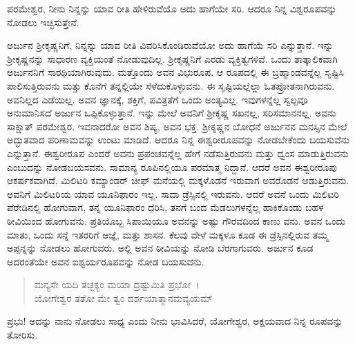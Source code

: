 {\small ಪರಮೇಶ್ವರ, ನೀನು ನಿನ್ನನ್ನು ಯಾವ ರೀತಿ ಹೇಳಿರುವೆಯೊ ಅದು ಹಾಗೆಯೇ ಸರಿ. ಆದರೂ ನಿನ್ನ ವಿಶ್ವರೂಪವನ್ನು ನೋಡಲು ಇಚ್ಛಿಸುತ್ತೇನೆ.}

ಅರ್ಜುನ ಶ‍್ರೀಕೃಷ್ಣನಿಗೆ, ನಿನ್ನನ್ನು ಯಾವ ರೀತಿ ವಿವರಿಸಿಕೊಂಡಿರುವೆಯೋ ಅದು ಹಾಗೆಯೆ ಸರಿ ಎನ್ನುತ್ತಾನೆ. ಇನ್ನು ಶ‍್ರೀಕೃಷ್ಣನನ್ನು ಸಾಧಾರಣ ವ್ಯಕ್ತಿಯಂತೆ ನೋಡುವುದಿಲ್ಲ. ಶ‍್ರೀಕೃಷ್ಣನಿಗೆ ಎರಡು ವ್ಯಕ್ತಿತ್ವಗಳಿವೆ. ಒಂದು ತಾತ್ಕಾಲಿಕವಾಗಿ ಅರ್ಜುನನಿಗೆ ಸಾರಥಿಯಾಗಿರುವುದು. ಮತ್ತೊಂದು ಅವನ ವಿಭುರೂಪ. ಆ ರೂಪದಲ್ಲಿ ಈ ಬ್ರಹ್ಮಾಂಡವನ್ನೆಲ್ಲ ಸೃಷ್ಟಿಸಿ ಪಾಲಿಸುತ್ತಿರುವನು ಮತ್ತು ಕೊನೆಗೆ ತನ್ನಲ್ಲಿಯೇ ಸೆಳೆದುಕೊಳ್ಳುವನು. ಈ ಸೃಷ್ಟಿಯಲ್ಲೆಲ್ಲಾ ಓತಪ್ರೋತನಾಗಿರುವನು. ಅವನಿಲ್ಲದ ಎಡೆಯಿಲ್ಲ. ಅವನ ಜ್ಞಾನಕ್ಕೆ, ಶಕ್ತಿಗೆ, ಪವಿತ್ರತೆಗೆ ಒಂದು ಅಂತ್ಯವಿಲ್ಲ. ಇವುಗಳನ್ನೆಲ್ಲ ಸ್ವಲ್ಪವೂ ಅನುಮಾನಿಸದೆ ಅರ್ಜುನ ಒಪ್ಪಿಕೊಳ್ಳುತ್ತಾನೆ. ಇನ್ನು ಮೇಲೆ ಅವನಿಗೆ ಶ‍್ರೀಕೃಷ್ಣ ಸಖನಲ್ಲ, ಸರಿಸಮಾನನಲ್ಲ. ಅವನು ಸಾಕ್ಷಾತ್ ಪರಮೇಶ್ವರ. ಇವನಾದರೋ ಅವನ ಶಿಷ್ಯ, ಅವನ ಭಕ್ತ. ಶ‍್ರೀಕೃಷ್ಣನ ಬೋಧನೆ ಅರ್ಜುನನ ಮನಸ್ಸಿನ ಮೇಲೆ ಅದ್ಭುತವಾದ ಪರಿಣಾಮವನ್ನು ಉಂಟು ಮಾಡಿದೆ. ಆದರೂ ನಿನ್ನ ಈಶ್ವರೀರೂಪವನ್ನು ನೋಡಬೇಕೆಂದು ಬಯಸುವೆನು ಎನ್ನುತ್ತಾನೆ. ಈಶ್ವರೀರೂಪ ಎಂದರೆ ಅವನು ಪ್ರಪಂಚವನ್ನೆಲ್ಲ ಹೇಗೆ ನಡೆಸುತ್ತಿರುವನು ಮತ್ತು ಧ್ವಂಸ ಮಾಡುತ್ತಿರುವನು ಎಂಬುದನ್ನು ನೋಡಬಯಸವನು. ಸಾಮಾನ್ಯ ರೂಪಿನಲ್ಲಿಯೂ ಪರಮಾತ್ಮ ನಿದ್ದಾನೆ. ಆದರೆ ಅವನ ಈಶ್ವರೀರೂಪು ಆಕರ್ಷಕವಾಗಿದೆ. ಮಿಲಿಟರಿ ಕಮ್ಯಾಂಡರ್ ಚೀಫ್ ಮನೆಯಲ್ಲಿ ಮಕ್ಕಳೊಡನೆ ಇರುವಾಗ ಅವರೊಡನೆ ಆಡುತ್ತಿರುವನು. ಅವನಿಗೆ ಮಿಲಿಟರಿಯ ಯಾವ ಯೂನಿಫಾರಂ ಇಲ್ಲ. ಸಾದಾ ಡ್ರೆಸ್ಸಿನಲ್ಲಿ ಇರುವನು. ಆದರೆ ಅವನೆ ಒಂದು ಮಿಲಿಟರಿ ಪೆರೇಡಿನಲ್ಲಿ ಹೋಗುವಾಗ, ತನ್ನ ಯೂನಿಫಾರಂ ಧರಿಸಿ, ತನಗೆ ಬಂದ ಮೆಡಲುಗಳನ್ನೆಲ್ಲ ಹಾಕಿಕೊಂಡು ಬಹಳ ಠೀವಿಯಿಂದ ಹೋಗುವನು. ಪ್ರತಿಯೊಬ್ಬ ಸಿಪಾಯಿಯೂ ಅವನನ್ನು ಅಷ್ಟು ಗೌರವದಿಂದ ಕಾಣು ವನು. ಅವನ ಒಂದು ಮಾತು, ಒಂದು ಸನ್ನೆ ಇತರರಿಗೆ ಆಜ್ಞೆ, ಮತ್ತು ಶಾಸನ. ಕೆಲವು ವೇಳೆ ಮಕ್ಕಳೂ ಕೂಡ ಈ ಡ್ರೆಸ್ಸಿನಲ್ಲಿರುವ ತಮ್ಮ ಅಪ್ಪನ್ನನ್ನು ನೋಡಲು ಹೋಗುವರು. ಅಲ್ಲಿ ಅವನ ಠೀವಿಯನ್ನು ನೋಡಿ ಬೆರಗಾಗುವರು. ಅರ್ಜುನ ಕೂಡ ಅದರಂತೆಯೇ ಅವನ ಐಶ್ವರ್ಯರೂಪವನ್ನು ನೋಡ ಬಯಸುವನು.

\begin{verse}
ಮನ್ಯಸೇ ಯದಿ ತಚ್ಛಕ್ಯಂ ಮಯಾ ದ್ರಷ್ಟುಮಿತಿ ಪ್ರಭೋ~।\\ಯೋಗೇಶ್ವರ ತತೋ ಮೇ ತ್ವಂ ದರ್ಶಯಾತ್ಮಾನಮವ್ಯಯಮ್ 
\end{verse}

{\small ಪ್ರಭು! ಅದನ್ನು ನಾನು ನೋಡಲು ಸಾಧ್ಯ ಎಂದು ನೀನು ಭಾವಿಸಿದರೆ, ಯೋಗೇಶ್ವರ, ಅಕ್ಷಯವಾದ ನಿನ್ನ ರೂಪವನ್ನು ತೋರಿಸು.}


